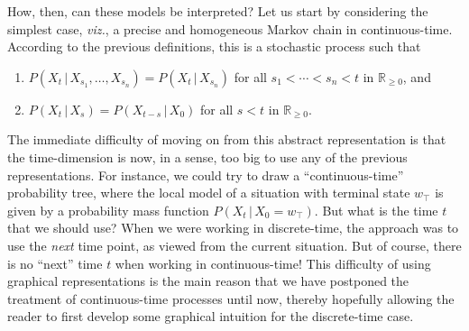 \documentclass[graybox]{svmult}
\newcommand{\reals}{\mathbb{R}}
\newcommand{\realsnonneg}{\reals_{\geq 0}}
\begin{document}
How, then, can these models be interpreted? Let us start by considering the simplest case, \emph{viz.}, a precise and homogeneous Markov chain in continuous-time. According to the previous definitions, this is a stochastic process such that
\begin{enumerate}
\item $P(X_t\,\vert\, X_{s_1},\ldots,X_{s_n}) = P(X_t\,\vert\,X_{s_n})$ for all $s_1<\cdots<s_n<t$ in $\realsnonneg$, and 
\item $P(X_t\,\vert\,X_s) = P(X_{t-s}\,\vert\,X_0)$ for all $s<t$ in $\realsnonneg$.
\end{enumerate}
The immediate difficulty of moving on from this abstract representation is that the time-dimension is now, in a sense, too big to use any of the previous representations. For instance, we could try to draw a ``continuous-time'' probability tree, where the local model of a situation with terminal state $w_\top$ is given by a probability mass function $P(X_{t}\,\vert\,X_0=w_\top)$. But what is the time $t$ that we should use? When we were working in discrete-time, the approach was to use the \emph{next} time point, as viewed from the current situation. But of course, there is no ``next'' time $t$ when working in continuous-time! This difficulty of using graphical representations is the main reason that we have postponed the treatment of continuous-time processes until now, thereby hopefully allowing the reader to first develop some graphical intuition for the discrete-time case.
\end{document}
